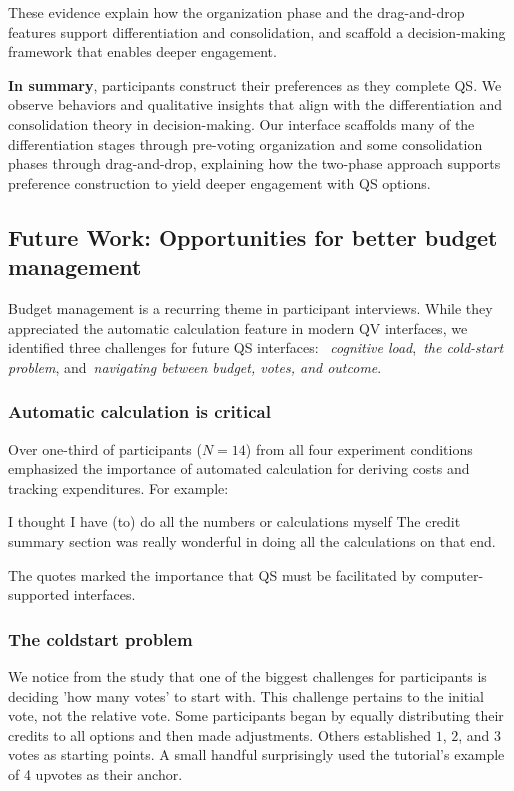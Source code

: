 These evidence explain how the organization phase and the drag-and-drop features support differentiation and consolidation, and scaffold a decision-making framework that enables deeper engagement.  

\textbf{In summary}, participants construct their preferences as they complete QS. We observe behaviors and qualitative insights that align with the differentiation and consolidation theory in decision-making. Our interface scaffolds many of the differentiation stages through pre-voting organization and some consolidation phases through drag-and-drop, explaining how the two-phase approach supports preference construction to yield deeper engagement with QS options.  

\subsection{Future Work: Opportunities for better budget management}
Budget management is a recurring theme in participant interviews. While they appreciated the automatic calculation feature in modern QV interfaces, we identified three challenges for future QS interfaces: ~\textit{cognitive load},~\textit{the cold-start problem}, and~\textit{navigating between budget, votes, and outcome}.

\subsubsection{Automatic calculation is critical}
Over one-third of participants ($N=14$) from all four experiment conditions emphasized the importance of automated calculation for deriving costs and tracking expenditures. For example:

\begin{displayquote}
I thought I have \bracketellipsis (to) do all the numbers or calculations myself \bracketellipsis The credit summary section was really wonderful in doing all the calculations on that end. \hfill{}
\end{displayquote}

The quotes marked the importance that QS must be facilitated by computer-supported interfaces.

\subsubsection{The coldstart problem}
We notice from the study that one of the biggest challenges for participants is deciding 'how many votes' to start with. This challenge pertains to the initial vote, not the relative vote. Some participants began by equally distributing their credits to all options and then made adjustments. Others established $1$, $2$, and $3$ votes as starting points. A small handful surprisingly used the tutorial's example of 4 upvotes as their anchor.

